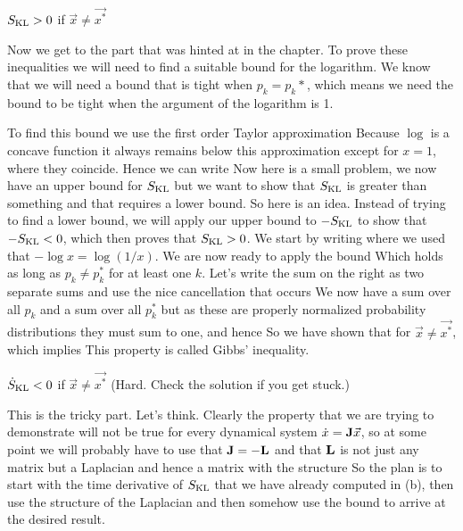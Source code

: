 \subquestion $S_{\rm KL}>0$ if $\vec{x}\neq \vec{x^*}$

\solution
Now we get to the part that was hinted at in the chapter. To prove these inequalities we will need to find a suitable bound for the logarithm. We know that we will need a bound that is tight when $p_k=p_k*$, which means we need the bound to be tight when the argument of the logarithm is 1. 

To find this bound we use the first order Taylor approximation 
Because $\log$ is a concave function it always remains below this approximation except for $x=1$, where they coincide. Hence we can write 
Now here is a small problem, we now have an upper bound for $S_{\rm KL}$ but we want to show that $S_{\rm KL}$ is greater than something and that requires a lower bound. So here is an idea. Instead of trying to find a lower bound, we will apply our upper bound to $-S_{\rm KL}$ to show that $-S_{\rm KL}<0$, which then proves that $S_{\rm KL}>0$. We start by writing
where we used that $-\log x = \log (1/x)$. We are now ready to apply the bound 
Which holds as long as $p_k\neq p_k^*$ for at least one $k$. Let's write the sum on the right as two separate sums and use the nice cancellation that occurs 
We now have a sum over all $p_k$ and a sum over all $p_k^*$ but as these are properly normalized probability distributions they must sum to one, and hence 
So we have shown that for $\vec{x}\neq \vec{x^*}$, 
which implies 
This property is called Gibbs' inequality.

\subquestion $\dot{S}_{\rm KL}< 0$ if $\vec{x}\neq \vec{x^*}$ (Hard. Check the solution if you get stuck.)

\solution
This is the tricky part. Let's think. Clearly the property that we are trying to demonstrate will not be true for every dynamical system $\dot{x}={\bf J}\vec{x}$, so at some point we will probably 
have to use that ${\bf J} = -{\bf L}$ and that $\bf L$ is not just any matrix but a Laplacian and hence a matrix with the structure 
So the plan is to start with the time derivative of $S_{\rm KL}$ that we have already computed in (b), then use the structure of the Laplacian and then somehow use the bound to arrive at the desired result. 

